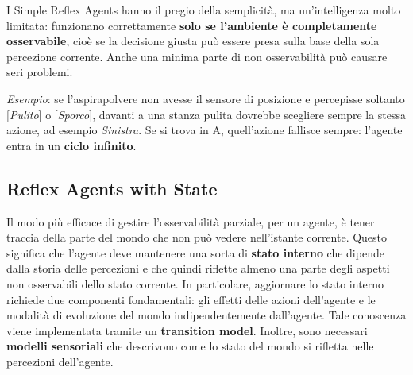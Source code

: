 \documentclass[a4paper, 11pt, oneside]{book}
\theoremstyle{definition}
\begin{document}
	I Simple Reflex Agents hanno il pregio della semplicit\`a, ma un'intelligenza
	molto limitata: funzionano correttamente \textbf{solo se l'ambiente \`e completamente
	osservabile}, cio\`e se la decisione giusta pu\`o essere presa sulla base
	della sola percezione corrente. Anche una minima parte di non osservabilit\`a pu\`o
	causare seri problemi.

	\emph{Esempio}: se l'aspirapolvere non avesse il sensore di posizione e percepisse
	soltanto [\emph{Pulito}] o [\emph{Sporco}], davanti a una stanza pulita
	dovrebbe scegliere sempre la stessa azione, ad esempio \emph{Sinistra}. Se si trova
	in A, quell'azione fallisce sempre: l'agente entra in un \textbf{ciclo
	infinito}.

	\subsection{Reflex Agents with State}
	Il modo pi\`u efficace di gestire l'osservabilit\`a parziale, per un agente, \`e
	tener traccia della parte del mondo che non pu\`o vedere nell'istante corrente.
	Questo significa che l'agente deve mantenere una sorta di \textbf{stato
	interno} che dipende dalla storia delle percezioni e che quindi riflette
	almeno una parte degli aspetti non osservabili dello stato corrente. In particolare,
	aggiornare lo stato interno richiede due componenti fondamentali: gli effetti delle
	azioni dell'agente e le modalit\`a di evoluzione del mondo indipendentemente dall'agente.
	Tale conoscenza viene implementata tramite un \textbf{transition model}.
	Inoltre, sono necessari \textbf{modelli sensoriali} che descrivono come lo
	stato del mondo si rifletta nelle percezioni dell'agente.
\end{document}

